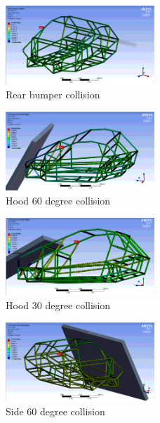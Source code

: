 \documentclass[10pt]{article}
\begin{document}
\begin{figure}[H]
\centering
\includegraphics[width=0.5\textwidth]{figures/fea/chassis/chassis-collision-bumper-rear}
\caption{Rear bumper collision}
\label{fig:chassis-collision-bumper-rear}
\end{figure}

\begin{figure}[H]
\centering
\includegraphics[width=0.5\textwidth]{figures/fea/chassis/chassis-collision-hood-60deg}
\caption{Hood 60 degree collision}
\label{fig:chassis-collision-hood-60deg}
\end{figure}

\begin{figure}[H]
\centering
\includegraphics[width=0.5\textwidth]{figures/fea/chassis/chassis-collision-hood-30deg}
\caption{Hood 30 degree collision}
\label{fig:chassis-collision-hood-30deg}
\end{figure}

\begin{figure}[H]
\centering
\includegraphics[width=0.5\textwidth]{figures/fea/chassis/chassis-collision-side-60deg}
\caption{Side 60 degree collision}
\label{fig:chassis-collision-side-60deg}
\end{figure}
\end{document}
